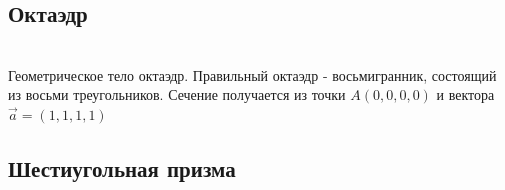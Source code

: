 \documentclass[12pt, a4paper, twoside]{report}
\begin{document}
\subsection{Октаэдр}
\\
Геометрическое тело октаэдр.
Правильный октаэдр - восьмигранник, состоящий из восьми треугольников. Сечение получается из точки $A(0,0,0,0)$ и вектора $\vec a=(1,1,1,1)$
\subsection{Шестиугольная призма}
\\
\end{document}

